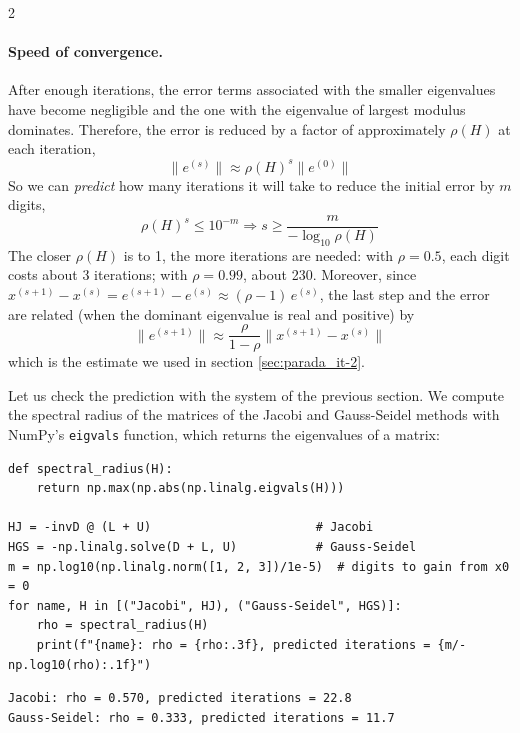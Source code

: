 \begin{paracol}{2}
\paragraph{Speed of convergence.} After enough iterations, the error terms associated with the smaller eigenvalues have become negligible and the one with the eigenvalue of largest modulus dominates. Therefore, the error is reduced by a factor of approximately $\rho(H)$ at each iteration,
\begin{equation*}
\lVert e^{(s)}\rVert \approx  \rho(H)^s \lVert e^{(0)}\rVert
\end{equation*}
So we can \emph{predict} how many iterations it will take to reduce the initial error by $m$ digits,
\begin{equation*}
\rho(H)^s \leq 10^{-m} \Rightarrow s \geq \frac{m}{-\log_{10}\rho(H)}
\end{equation*}
The closer $\rho(H)$ is to 1, the more iterations are needed: with $\rho=0.5$, each digit costs about 3 iterations; with $\rho=0.99$, about 230. Moreover, since $x^{(s+1)}-x^{(s)}=e^{(s+1)}-e^{(s)}\approx(\rho-1)\,e^{(s)}$, the last step and the error are related (when the dominant eigenvalue is real and positive) by
\begin{equation*}
\lVert e^{(s+1)}\rVert\approx\frac{\rho}{1-\rho}\lVert x^{(s+1)}-x^{(s)}\rVert
\end{equation*}
which is the estimate we used in section \ref{sec:parada_it-2}.

Let us check the prediction with the system of the previous section. We compute the spectral radius of the matrices of the Jacobi and Gauss-Seidel methods with NumPy's \texttt{eigvals} function, which returns the eigenvalues of a matrix:
\end{paracol}

\begin{verbatim}
def spectral_radius(H):
    return np.max(np.abs(np.linalg.eigvals(H)))

HJ = -invD @ (L + U)                       # Jacobi
HGS = -np.linalg.solve(D + L, U)           # Gauss-Seidel
m = np.log10(np.linalg.norm([1, 2, 3])/1e-5)  # digits to gain from x0 = 0
for name, H in [("Jacobi", HJ), ("Gauss-Seidel", HGS)]:
    rho = spectral_radius(H)
    print(f"{name}: rho = {rho:.3f}, predicted iterations = {m/-np.log10(rho):.1f}")
\end{verbatim}
\begin{verbatim}
Jacobi: rho = 0.570, predicted iterations = 22.8
Gauss-Seidel: rho = 0.333, predicted iterations = 11.7
\end{verbatim}


